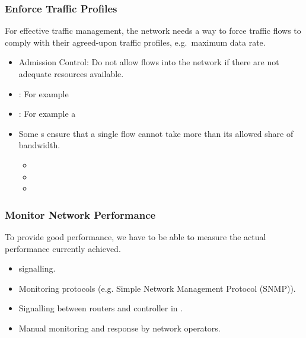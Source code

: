 \subsubsection{Enforce Traffic Profiles}\label{subsubsec:Enforce_Traffic_Profiles}
For effective traffic management, the network needs a way to force traffic flows to comply with their agreed-upon traffic profiles, e.g.\ maximum data rate.
\begin{itemize}[noitemsep]
\item Admission Control: Do not allow flows into the network if there are not adequate resources available.
\item {}: For example 
\item {}: For example a 
\item Some s ensure that a single flow cannot take more than its allowed share of bandwidth.
  \begin{itemize}[noitemsep]
  \item {}
  \item {}
  \item {}
  \end{itemize}
\end{itemize}

\subsubsection{Monitor Network Performance}\label{subsubsec:Monitor_Network_Performance}
To provide good performance, we have to be able to measure the actual performance currently achieved.
\begin{itemize}[noitemsep]
\item {} signalling.
\item Monitoring protocols (e.g. Simple Network Management Protocol (SNMP)).
\item Signalling between routers and controller in .
\item Manual monitoring and response by network operators.
\end{itemize}

